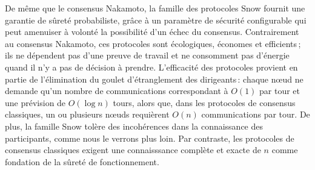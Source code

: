 \documentclass[a4,twocolumn,10pt]{article}
\newcommand{\Oh}[1]{O(#1)}
\theoremstyle{definition}
\begin{document}
De même que le consensus Nakamoto, la famille des protocoles Snow fournit une garantie de sûreté probabiliste, grâce à un paramètre de sécurité configurable qui peut amenuiser à volonté la possibilité d'un échec du consensus.
Contrairement au consensus Nakamoto, ces protocoles sont écologiques, économes et efficients\,; ils ne dépendent pas d'une preuve de travail\cite{DworkN92} et ne consomment pas d'énergie quand il n'y a pas de décision à prendre.
L'efficacité des protocoles provient en partie de l'élimination du goulet d'étranglement des dirigeants\,: chaque nœud ne demande qu'un nombre de communications correspondant à $\Oh{1}$ par tour et une prévision de $\Oh{\log{n}}$ tours, alors que, dans les protocoles de consensus classiques, un ou plusieurs nœuds requièrent $\Oh{n}$ communications par tour.
De plus, la famille Snow tolère des incohérences dans la connaissance des participants, comme nous le verrons plus loin. Par contraste, les protocoles de consensus classiques exigent une connaisssance complète et exacte de $n$ comme fondation de la sûreté de fonctionnement.
\end{document}

